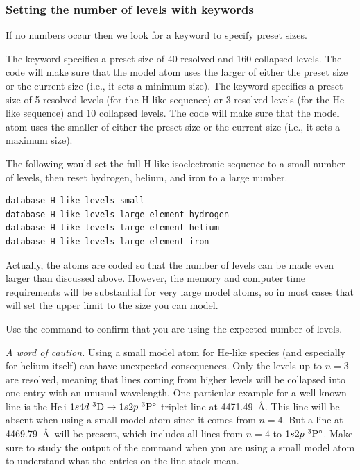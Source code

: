 \subsubsection{Setting the number of levels with keywords}

If no numbers occur then we look for a keyword to specify preset sizes.

The keyword  specifies a preset size of 40 resolved and 160
collapsed levels. The code will make sure that the model atom uses the larger
of either the preset size or the current size (i.e., it sets a minimum size).
The keyword  specifies a preset size of 5 resolved levels
(for the H-like sequence) or 3 resolved levels (for the He-like sequence) and
10 collapsed levels. The code will make sure that the model atom uses the
smaller of either the preset size or the current size (i.e., it sets a maximum
size).

The following would set the full H-like isoelectronic
sequence to a small number of levels, then reset hydrogen, helium,
and iron to a large number.
\begin{verbatim}
database H-like levels small
database H-like levels large element hydrogen
database H-like levels large element helium
database H-like levels large element iron
\end{verbatim}

Actually, the atoms are
coded so that the number of levels can be made even larger than discussed above.
However, the memory and computer time requirements
will be substantial for very large model atoms, so in most cases that will
set the upper limit to the size you can model.

Use the  command to confirm that you are using
the expected number of levels.

{\it A word of caution.} Using a small model atom for He-like species (and
especially for helium itself) can have unexpected consequences. Only the
levels up to $n = 3$ are resolved, meaning that lines coming from higher
levels will be collapsed into one entry with an unusual wavelength. One
particular example for a well-known line is the He\,{\sc i} $1s4d\ ^{3}{\rm D}
\rightarrow 1s2p\ ^{3}{\rm P}^\circ$ triplet line at 4471.49~\AA. This line
will be absent when using a small model atom since it comes from $n = 4$. But
a line at 4469.79~\AA\ will be present, which includes all lines from $n=4$ to
$1s2p\ ^{3}{\rm P}^\circ$. Make sure to study the output of the
 command when you are using a small model atom to
understand what the entries on the line stack mean.

